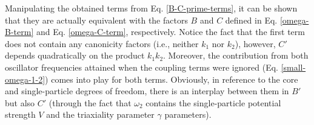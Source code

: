 Manipulating the obtained terms from Eq. \ref{B-C-prime-terms}, it can be shown that they are actually equivalent with the factors $B$ and $C$ defined in Eq. \ref{omega-B-term} and Eq. \ref{omega-C-term}, respectively. Notice the fact that the first term does not contain any canonicity factors (i.e., neither $k_1$ nor $k_2$), however, $C'$ depends quadratically on the product $k_1k_2$. Moreover, the contribution from both oscillator frequencies attained when the coupling terms were ignored (Eq. \ref{small-omega-1-2}) comes into play for both terms. Obviously, in reference to the core and single-particle degrees of freedom, there is an interplay between them in $B'$ but also $C'$ (through the fact that $\omega_2$ contains the single-particle potential strength $V$ and the triaxiality parameter $\gamma$ parameters).

